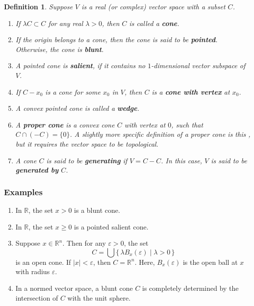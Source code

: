 \documentclass[12pt]{article}
\newcommand{\sR}[0]{\mathbb{R}}
\newtheorem{defn}{Definition}
\begin{document}

\begin{defn}
Suppose $V$ is a real (or complex) vector space with a subset $C$.
\begin{enumerate}
\item If $\lambda C \subset C$ for any real $\lambda >0$,
then $C$ is called a {\bf cone}.
\item If the origin belongs to a cone, then the cone is said to be {\bf pointed}.
Otherwise, the cone is {\bf blunt}.
\item A pointed cone is {\bf salient}, if it contains no
$1$-dimensional vector subspace of $V$.
\item If $C-x_0$ is a cone for some $x_0$ in $V$,
then $C$ is a {\bf cone with vertex} at $x_0$.
\item A convex pointed cone is called a {\bf wedge}.
\item A {\bf proper cone} is a convex cone $C$ with vertex at $0$, such that $C\cap (-C)=\lbrace 0\rbrace$.  A slightly more specific definition of a proper cone is this , but it requires the vector space to be topological.
\item A cone $C$ is said to be {\bf generating} if $V=C-C$.  In this case, $V$ is said to be {\bf generated by} $C$.
\end{enumerate}
\end{defn}

\subsubsection*{Examples}
\begin{enumerate}
\item In $\sR$, the set $x>0$ is a blunt cone.
\item In $\sR$, the set $x\ge 0$ is a pointed salient cone.
\item Suppose $x\in \sR^n$. Then for any $\varepsilon>0$, the set
$$
C=\bigcup \{\, \lambda B_x(\varepsilon) \mid \lambda >0 \,\}
$$
is an open cone. If $|x| < \varepsilon$, then $C=\sR^n$.
Here,
$B_x(\varepsilon)$ is the open ball at $x$ with radius $\varepsilon$.
\item In a normed vector space, a blunt cone $C$ is completely
determined by the intersection of $C$ with the unit sphere. 
\end{enumerate}
\end{document}
